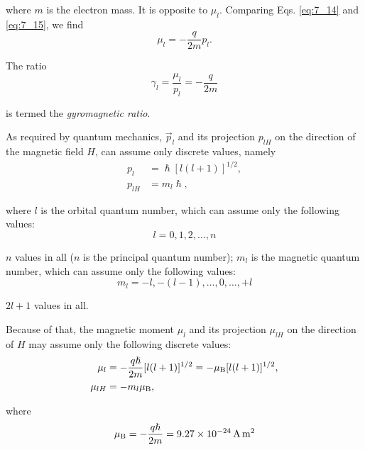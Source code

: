 \noindent
where $m$ is the electron mass. It is opposite to $\mu_l$. Comparing Eqs. \eqref{eq:7_14} and \eqref{eq:7_15}, we find
\begin{equation}\label{eq:7_16}
    \mu_l = - \frac{q}{2m} p_l.
\end{equation}

\noindent
The ratio
\begin{equation}\label{eq:7_17}
    \gamma_l = \frac{\mu_l}{p_l} = - \frac{q}{2m}
\end{equation}

\noindent
is termed the \textit{gyromagnetic ratio}.

As required by quantum mechanics, $\vec{p}_l$ and its projection $p_{lH}$ on the direction of the magnetic field $H$, can assume only discrete values, namely
\begin{align}
    p_l &= \hslash [l (l + 1)]^{1/2}, \label{eq:7_18}\\
    p_{lH} &= m_l \hslash \label{eq:7_19},
\end{align}

\noindent
where $l$ is the orbital quantum number, which can assume only the following values:
\begin{equation}\label{eq:7_18p}
    l = 0, 1, 2, \ldots, n \tag{7.18$'$}
\end{equation}

\noindent
$n$ values in all ($n$ is the principal quantum number); $m_l$ is the magnetic quantum number, which can assume only the following values:
\begin{equation}\label{eq:7_19p}
    m_l = -l, -(l-1), \ldots, 0, \ldots, +l \tag{7.19$'$}
\end{equation}

\noindent
$2l+1$ values in all.

Because of that, the magnetic moment $\mu_l$ and its projection $\mu_{lH}$ on the direction of $H$ may assume only the following discrete values:
\begin{align}
    \mu_l &= - \frac{q\hslash}{2m} [l (l + 1)]^{1/2} = -\mu_{\text{B}} [l (l + 1)]^{1/2}, \label{eq:7_20}\\
    \mu_{lH} &= - m_l \mu_{\text{B}} \label{eq:7_21},
\end{align}

\noindent
where
\begin{equation}\label{eq:7_22}
    \mu_{\text{B}} = - \frac{q\hslash}{2m} = \SI{9.27e-24}{\ampere\metre\squared}
\end{equation}

